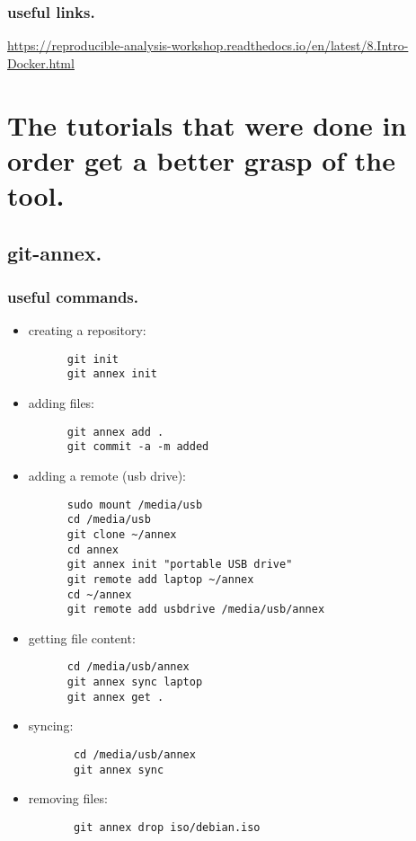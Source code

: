 \documentclass[11pt]{article}
\begin{document}
\subsubsection{useful links.}
\label{sec:org2a17d8e}
\url{https://reproducible-analysis-workshop.readthedocs.io/en/latest/8.Intro-Docker.html}


\section{The tutorials that were done in order get a better grasp of the tool.}
\label{sec:orgd36c39f}
\subsection{git-annex.}
\label{sec:org9e47c2e}
\subsubsection{useful commands.}
\label{sec:orga87d312}
\begin{itemize}
\item creating a repository:
\begin{verbatim}
      git init 
      git annex init
\end{verbatim}

\item adding files:
\begin{verbatim}
      git annex add .
      git commit -a -m added
\end{verbatim}

\item adding a remote (usb drive):
\begin{verbatim}
      sudo mount /media/usb
      cd /media/usb
      git clone ~/annex
      cd annex
      git annex init "portable USB drive"
      git remote add laptop ~/annex
      cd ~/annex
      git remote add usbdrive /media/usb/annex
\end{verbatim}

\item getting file content:
\begin{verbatim}
      cd /media/usb/annex
      git annex sync laptop
      git annex get .
\end{verbatim}

\item syncing:
\begin{verbatim}
       cd /media/usb/annex
       git annex sync
\end{verbatim}

\item removing files:
\begin{verbatim}
       git annex drop iso/debian.iso
\end{verbatim}
\end{itemize}
\end{document}
